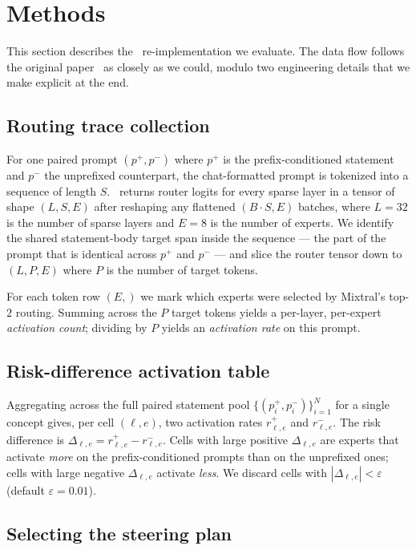 \section{Methods}
\label{sec:methods}

This section describes the \steermoe~re-implementation we evaluate. The data
flow follows the original paper~\citep{wang2024steermoe} as closely as we
could, modulo two engineering details that we make explicit at the end.

\subsection{Routing trace collection}
\label{sec:routing-trace}

For one paired prompt $(p^+, p^-)$ where $p^+$ is the prefix-conditioned
statement and $p^-$ the unprefixed counterpart, the chat-formatted prompt is
tokenized into a sequence of length $S$. \mixtral~returns router logits for
every sparse layer in a tensor of shape $(L, S, E)$ after reshaping any
flattened $(B \cdot S, E)$ batches, where $L=32$ is the number of sparse layers
and $E=8$ is the number of experts. We identify the shared statement-body
target span inside the sequence --- the part of the prompt that is identical
across $p^+$ and $p^-$ --- and slice the router tensor down to $(L, P, E)$
where $P$ is the number of target tokens.

For each token row $(E,)$ we mark which experts were selected by Mixtral's
top-$2$ routing. Summing across the $P$ target tokens yields a per-layer,
per-expert \emph{activation count}; dividing by $P$ yields an
\emph{activation rate} on this prompt.

\subsection{Risk-difference activation table}

Aggregating across the full paired statement pool $\{(p^+_i, p^-_i)\}_{i=1}^N$
for a single concept gives, per cell $(\ell, e)$, two activation rates
$r^+_{\ell,e}$ and $r^-_{\ell,e}$. The risk difference is
$\Delta_{\ell,e} = r^+_{\ell,e} - r^-_{\ell,e}$. Cells with large positive
$\Delta_{\ell,e}$ are experts that activate \emph{more} on the
prefix-conditioned prompts than on the unprefixed ones; cells with large
negative $\Delta_{\ell,e}$ activate \emph{less}. We discard cells with
$|\Delta_{\ell,e}| < \varepsilon$ (default $\varepsilon = 0.01$).

\subsection{Selecting the steering plan}

